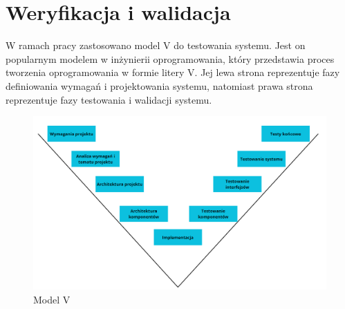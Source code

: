 \documentclass[a4paper,twoside,12pt]{book}
\begin{document}


%      

%      




\chapter{Weryfikacja i walidacja}
W ramach pracy zastosowano model V do testowania systemu. Jest on popularnym modelem w inżynierii oprogramowania, który przedstawia proces tworzenia oprogramowania w formie litery V. Jej lewa strona reprezentuje fazy definiowania wymagań i projektowania systemu, natomiast prawa strona reprezentuje fazy testowania i walidacji systemu. 
\begin{figure}[!hb]
	\centering
	\includegraphics[width=1\textwidth]{images/modelV.png}
	\caption{Model V}
	\label{fig:modelv}
\end{figure}
\newpage
\end{document}
